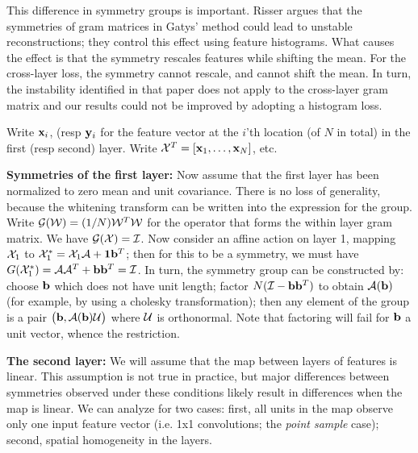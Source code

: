 This difference in symmetry groups is important.  Risser argues that
the symmetries of gram matrices in Gatys' method could lead to
unstable reconstructions; they control this effect using feature
histograms.  What causes the effect is that the symmetry rescales features while shifting the mean.  
For the cross-layer loss, the symmetry cannot rescale, and cannot shift the mean.  In turn, the instability
identified in that paper does not apply to the cross-layer gram matrix and our results could not be improved by adopting
a histogram loss.

Write ${\bf {x}}_{i}$, (resp ${\bf {y}}_i$ for the feature vector at the $i$'th location (of $N$ in total)
in the first (resp second) layer.  Write ${\cal {X}}^T=\left[{\bf {x}}_{1}, \ldots,
{\bf {x}}_{N}\right]$, etc.   

{\bf Symmetries of the first layer:} Now assume that the first layer has been normalized to zero mean and
unit covariance.  There is no loss of generality, because the whitening transform
can be written into the expression for the group. Write ${\cal
  G}({\cal {W}})=(1/N){\cal {W}}^T{\cal {W}}$ for the operator that forms
the within layer gram matrix. We have ${\cal G}({\cal {X}})={\cal {I}}$.   
Now consider an affine action on layer 1, mapping ${\cal {X}}_1$ to ${\cal {X}}_1^*={\cal {X}}_1 {\cal {A}}+{\bf {1}}{\bf {b}}^T$; then for this to be a symmetry, we must have
$G({\cal {X}}_1^*)= {\cal {A}}{\cal {A}}^T+{\bf {b}}{\bf {b}}^T={\cal {I}}$.  In
turn, the symmetry group can be constructed by: choose ${\bf {b}}$
which does not have unit length; factor
$N({\cal {I}}-{\bf {b}}{\bf {b}}^T)$ to obtain ${\cal {A}}({\bf {b}})$ (for
example, by using a cholesky transformation); then any element of the
group is a pair $\left({\bf {b}}, {\cal {A}}({\bf {b}}){\cal {U}}\right)$
where ${\cal {U}}$ is orthonormal.  Note that factoring will fail for
${\bf {b}}$ a unit vector, whence the restriction. 

{\bf The second layer:}   We will assume that the map between layers
of features is linear.  This assumption is not true in practice, but major
differences between symmetries observed under these conditions likely
result in differences when the map is linear.  We can analyze for two
cases: first, all units in the map observe only one input feature
vector (i.e. 1x1 convolutions; the {\em point sample} case); second, spatial homogeneity in the
layers.

